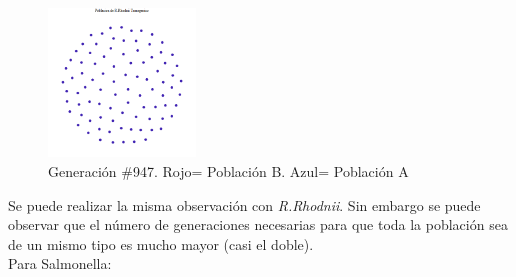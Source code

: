 \documentclass[12pt]{article}
\numberwithin{equation}{section}
\begin{document}
\begin{figure}[!ht]
\includegraphics[width=0.35\textwidth]{rhodnii_moran_947.png}
\caption{Generación $\#$947. Rojo= Población B. Azul= Población A }
\FloatBarrier
\end{figure}
\FloatBarrier
Se puede realizar la misma observación con \textit{R.Rhodnii}. Sin embargo se puede observar que el número de generaciones necesarias para que toda la población sea de un mismo tipo es mucho mayor (casi el doble).\\

Para Salmonella:\\
\end{document}
